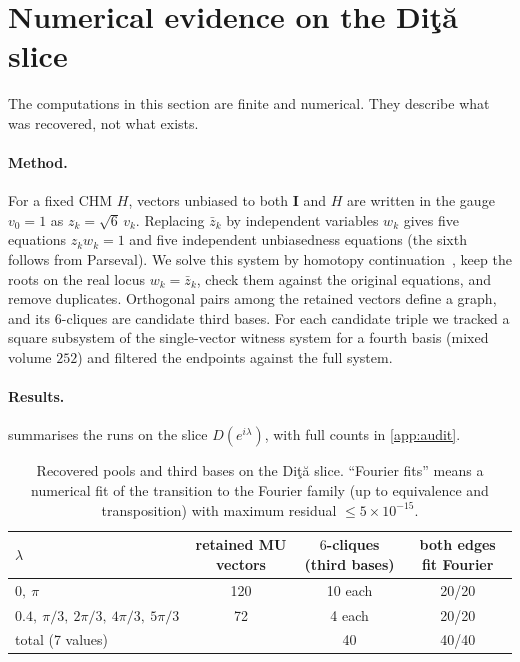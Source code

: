 \documentclass[11pt]{article}
\numberwithin{equation}{section}
\theoremstyle{plain}
\theoremstyle{definition}
\theoremstyle{remark}
\newcommand{\I}{\mathbf{I}}
\newcommand{\Dita}{\texorpdfstring{Di\c{t}\u{a}}{Dita}}
\begin{document}
\section{Numerical evidence on the \Dita{} slice}\label{sec:numerics}

The computations in this section are finite and numerical. They describe what was recovered, not what exists.

\paragraph{Method.} For a fixed CHM $H$, vectors unbiased to both $\I$ and $H$ are written in the gauge $v_0=1$ as $z_k=\sqrt6\,v_k$. Replacing $\bar z_k$ by independent variables $w_k$ gives five equations $z_kw_k=1$ and five independent unbiasedness equations (the sixth follows from Parseval). We solve this system by homotopy continuation~\cite{HomotopyContinuation}, keep the roots on the real locus $w_k=\bar z_k$, check them against the original equations, and remove duplicates. Orthogonal pairs among the retained vectors define a graph, and its $6$-cliques are candidate third bases. For each candidate triple we tracked a square subsystem of the single-vector witness system for a fourth basis (mixed volume $252$) and filtered the endpoints against the full system.

\paragraph{Results.}  summarises the runs on the slice $D(e^{i\lambda})$, with full counts in \cref{app:audit}.

\begin{table}[ht]
\centering\small
\caption{Recovered pools and third bases on the \Dita{} slice. ``Fourier fits'' means a numerical fit of the transition to the Fourier family (up to equivalence and transposition) with maximum residual $\le5\times10^{-15}$.}
\label{tab:numerics}
\begin{tabular}{@{}lccc@{}}
\toprule
$\lambda$ & retained MU vectors & $6$-cliques (third bases) & both edges fit Fourier\\
\midrule
$0,\ \pi$ & 120 & 10 each & 20/20\\
$0.4,\ \pi/3,\ 2\pi/3,\ 4\pi/3,\ 5\pi/3$ & 72 & 4 each & 20/20\\
\midrule
total (7 values) & & 40 & 40/40\\
\bottomrule
\end{tabular}
\end{table}
\end{document}
